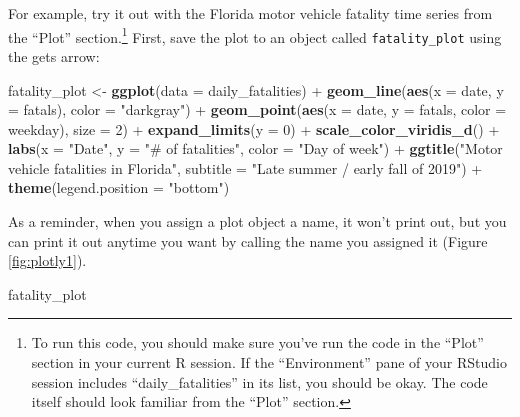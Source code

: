 \documentclass[]{tufte-book}
\newenvironment{Shaded}{}{}
\newcommand{\DataTypeTok}[1]{\textcolor[rgb]{0.56,0.13,0.00}{#1}}
\newcommand{\DecValTok}[1]{\textcolor[rgb]{0.25,0.63,0.44}{#1}}
\newcommand{\KeywordTok}[1]{\textcolor[rgb]{0.00,0.44,0.13}{\textbf{#1}}}
\newcommand{\NormalTok}[1]{#1}
\newcommand{\OperatorTok}[1]{\textcolor[rgb]{0.40,0.40,0.40}{#1}}
\newcommand{\StringTok}[1]{\textcolor[rgb]{0.25,0.44,0.63}{#1}}
\begin{document}
For example, try it out with the Florida motor vehicle fatality time series from the ``Plot''
section.\footnote{To run this code, you should make sure you've run the code in the ``Plot'' section
  in your current R session. If the ``Environment'' pane of your RStudio session includes
  ``daily\_fatalities'' in its list, you should be okay. The code itself should look familiar from
  the ``Plot'' section.} First, save the plot to an object
called \texttt{fatality\_plot} using the gets arrow:

\begin{Shaded}
\begin{Highlighting}[]
\NormalTok{fatality_plot <-}\StringTok{ }\KeywordTok{ggplot}\NormalTok{(}\DataTypeTok{data =}\NormalTok{ daily_fatalities) }\OperatorTok{+}\StringTok{ }
\StringTok{    }\KeywordTok{geom_line}\NormalTok{(}\KeywordTok{aes}\NormalTok{(}\DataTypeTok{x =}\NormalTok{ date, }\DataTypeTok{y =}\NormalTok{ fatals), }\DataTypeTok{color =} \StringTok{"darkgray"}\NormalTok{) }\OperatorTok{+}\StringTok{ }
\StringTok{    }\KeywordTok{geom_point}\NormalTok{(}\KeywordTok{aes}\NormalTok{(}\DataTypeTok{x =}\NormalTok{ date, }\DataTypeTok{y =}\NormalTok{ fatals, }\DataTypeTok{color =}\NormalTok{ weekday), }
        \DataTypeTok{size =} \DecValTok{2}\NormalTok{) }\OperatorTok{+}\StringTok{ }\KeywordTok{expand_limits}\NormalTok{(}\DataTypeTok{y =} \DecValTok{0}\NormalTok{) }\OperatorTok{+}\StringTok{ }\KeywordTok{scale_color_viridis_d}\NormalTok{() }\OperatorTok{+}\StringTok{ }
\StringTok{    }\KeywordTok{labs}\NormalTok{(}\DataTypeTok{x =} \StringTok{"Date"}\NormalTok{, }\DataTypeTok{y =} \StringTok{"# of fatalities"}\NormalTok{, }\DataTypeTok{color =} \StringTok{"Day of week"}\NormalTok{) }\OperatorTok{+}\StringTok{ }
\StringTok{    }\KeywordTok{ggtitle}\NormalTok{(}\StringTok{"Motor vehicle fatalities in Florida"}\NormalTok{, }
        \DataTypeTok{subtitle =} \StringTok{"Late summer / early fall of 2019"}\NormalTok{) }\OperatorTok{+}\StringTok{ }
\StringTok{    }\KeywordTok{theme}\NormalTok{(}\DataTypeTok{legend.position =} \StringTok{"bottom"}\NormalTok{)}
\end{Highlighting}
\end{Shaded}

As a reminder, when you assign a plot object a name, it won't print out, but you can print
it out anytime you want by calling the name you assigned it (Figure \ref{fig:plotly1}).

\begin{Shaded}
\begin{Highlighting}[]
\NormalTok{fatality_plot}
\end{Highlighting}
\end{Shaded}
\end{document}
